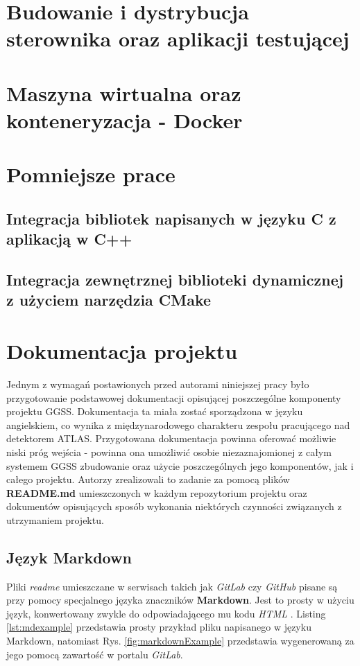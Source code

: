 \newpage
\section{Budowanie i dystrybucja sterownika oraz aplikacji testującej}

\newpage
\section{Maszyna wirtualna oraz konteneryzacja - Docker}

\newpage
\section{Pomniejsze prace}
\subsection{Integracja bibliotek napisanych w języku C z aplikacją w C++}
\subsection{Integracja zewnętrznej biblioteki dynamicznej z użyciem narzędzia CMake}

\newpage
\section{Dokumentacja projektu}
Jednym z wymagań postawionych przed autorami niniejszej pracy było przygotowanie podstawowej dokumentacji opisującej poszczególne komponenty projektu GGSS. Dokumentacja ta miała zostać sporządzona w języku angielskiem, co wynika z międzynarodowego charakteru zespołu pracującego nad detektorem ATLAS. Przygotowana dokumentacja powinna oferować możliwie niski próg wejścia - powinna ona umożliwić osobie niezaznajomionej z całym systemem GGSS zbudowanie oraz użycie poszczególnych jego komponentów, jak i całego projektu. Autorzy zrealizowali to zadanie za pomocą plików \textbf{README.md} umieszczonych w każdym repozytorium projektu oraz dokumentów opisujących sposób wykonania niektórych czynności związanych z utrzymaniem projektu.

\subsection{Język Markdown}
Pliki \textit{readme} umieszczane w serwisach takich jak \textit{GitLab} czy \textit{GitHub} pisane są przy pomocy specjalnego języka znaczników \textbf{Markdown}. Jest to prosty w użyciu język, konwertowany zwykle do odpowiadającego mu kodu \textit{HTML} \cite{Markdown1}. Listing \ref{lst:mdexample} przedstawia prosty przykład pliku napisanego w języku Markdown, natomiast Rys. \ref{fig:markdownExample} przedstawia wygenerowaną za jego pomocą zawartość w portalu \textit{GitLab}.

